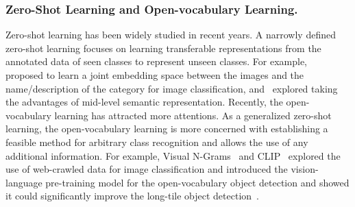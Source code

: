 \documentclass[runningheads]{llncs}
\begin{document}
\subsubsection{Zero-Shot Learning and Open-vocabulary Learning.}
Zero-shot learning has been widely studied in recent years. A narrowly defined zero-shot learning focuses on learning transferable representations from the annotated data of seen classes to represent unseen classes. For example,~\cite{akata2015label,xian2016latent} proposed to learn a joint embedding space between the images and the name/description of the category for image classification, and~\cite{lampert2013attribute} explored taking the advantages of mid-level semantic representation. Recently, the open-vocabulary learning has attracted more attentions. As a generalized zero-shot learning, the open-vocabulary learning is more concerned with establishing a feasible method for arbitrary class recognition and allows the use of any additional information. For example, Visual N-Grams~\cite{li2017learning} and CLIP~\cite{radford2021learning} explored the use of web-crawled data for image classification and \cite{gu2021zero} introduced the vision-language pre-training model for the open-vocabulary object detection and showed it could significantly improve the long-tile object detection~\cite{gupta2019lvis}.
\end{document}
